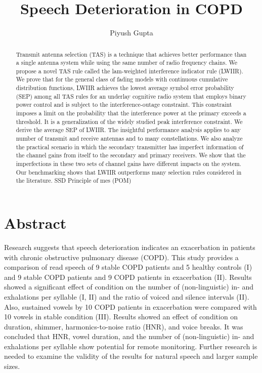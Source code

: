 \documentclass{article}%
\title{Speech Deterioration in COPD}%
\author{Piyush Gupta}%
\date{}%
\begin{document}
%
\normalsize%
\maketitle%
\section{Abstract}%
\label{sec:Abstract}%
\begin{abstract}
    
    
    Transmit antenna selection (TAS) is a technique that achieves better performance than a single
    antenna system while using the same number of radio frequency chains. We propose a novel TAS
    rule called the lam-weighted interference indicator rule (LWIIR). We prove that for the general class of fading models with continuous cumulative distribution functions, LWIIR achieves the lowest average symbol error probability (SEP) among all TAS rules for  an underlay cognitive radio system that employs binary power control and is subject to the interference-outage constraint. This constraint imposes a limit on the probability that the interference power at the primary exceeds a threshold. It is a generalization of the widely studied peak interference constraint. We derive the average SEP of LWIIR. The insightful performance analysis applies to any number of transmit and receive antennas and to many constellations.  We also analyze the practical scenario in which the secondary transmitter has imperfect information of the channel gains from itself to the secondary and primary receivers. We show that the imperfections in these two sets of channel gains have different impacts on the system. Our benchmarking shows that LWIIR outperforms many selection rules considered in the literature.
    SSD
        Principle of mes (POM)
\end{abstract}

%
Research suggests that speech deterioration indicates an exacerbation in patients with chronic obstructive pulmonary disease (COPD). This study provides a comparison of read speech of 9 stable COPD patients and 5 healthy controls (I) and 9 stable COPD patients and 9 COPD patients in exacerbation (II). Results showed a significant effect of condition on the number of (non{-}linguistic) in{-} and exhalations per syllable (I, II) and the ratio of voiced and silence intervals (II). Also, sustained vowels by 10 COPD patients in exacerbation were compared with 10 vowels in stable condition (III). Results showed an effect of condition on duration, shimmer, harmonics{-}to{-}noise ratio (HNR), and voice breaks. It was concluded that HNR, vowel duration, and the number of (non{-}linguistic) in{-} and exhalations per syllable show potential for remote monitoring. Further research is needed to examine the validity of the results for natural speech and larger sample sizes.%
\end{document}
